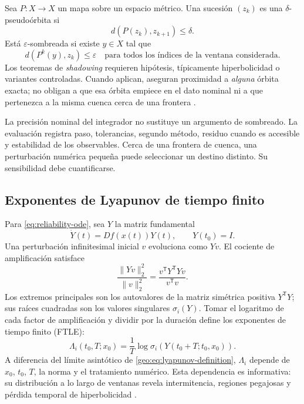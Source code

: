 Sea \(P:X\to X\) un mapa sobre un espacio métrico. Una sucesión
\((z_k)\) es una \(\delta\)-pseudoórbita si
\begin{equation}
 d(P(z_k),z_{k+1})\leq\delta .
 \label{eq:reliability-pseudo-orbit}
\end{equation}
Está \(\varepsilon\)-sombreada si existe \(y\in X\) tal que
\begin{equation}
 d(P^k(y),z_k)\leq\varepsilon
 \quad\text{para todos los índices de la ventana considerada}.
 \label{eq:reliability-shadowing}
\end{equation}
Los teoremas de \emph{shadowing} requieren hipótesis, típicamente
hiperbolicidad o variantes controladas. Cuando aplican, aseguran proximidad a
\emph{alguna} órbita exacta; no obligan a que esa órbita empiece en el dato
nominal ni a que pertenezca a la misma cuenca cerca de una frontera
\cite{Ott2002Chaos,VallejoSanjuan2017Predictability}.

La precisión nominal del integrador no sustituye un argumento de sombreado. La
evaluación registra paso, tolerancias, segundo método,
residuo cuando es accesible y estabilidad de los observables. Cerca de una
frontera de cuenca, una perturbación numérica pequeña puede seleccionar un
destino distinto. Su sensibilidad debe cuantificarse.

\subsection{Exponentes de Lyapunov de tiempo finito}

Para \cref{eq:reliability-ode}, sea \(Y\) la matriz fundamental
\begin{equation}
 \dot Y(t)=Df(x(t))Y(t),\qquad Y(t_0)=I.
 \label{eq:reliability-variational}
\end{equation}
Una perturbación infinitesimal inicial \(v\) evoluciona como \(Yv\).
El cociente de amplificación satisface
\[
 \frac{\|Yv\|_2^2}{\|v\|_2^2}
 =\frac{v^{\mathsf T}Y^{\mathsf T}Yv}{v^{\mathsf T}v}.
\]
Los extremos principales son los autovalores de la matriz simétrica positiva
\(Y^{\mathsf T}Y\); sus raíces cuadradas son los valores singulares
\(\sigma_i(Y)\). Tomar el logaritmo de cada factor de amplificación y
dividir por la duración define los exponentes de tiempo finito (FTLE):
\begin{equation}
 \Lambda_i(t_0,T;x_0)
 =\frac1T\log\sigma_i\!\left(Y(t_0+T;t_0,x_0)\right).
 \label{eq:reliability-ftle}
\end{equation}
A diferencia del límite asintótico de
\cref{geo:eq:lyapunov-definition}, \(\Lambda_i\) depende de \(x_0\), \(t_0\),
\(T\), la norma y el tratamiento numérico. Esta dependencia es informativa:
su distribución a lo largo de ventanas revela intermitencia, regiones
pegajosas y pérdida temporal de hiperbolicidad
\cite{VallejoSanjuan2017Predictability}.

